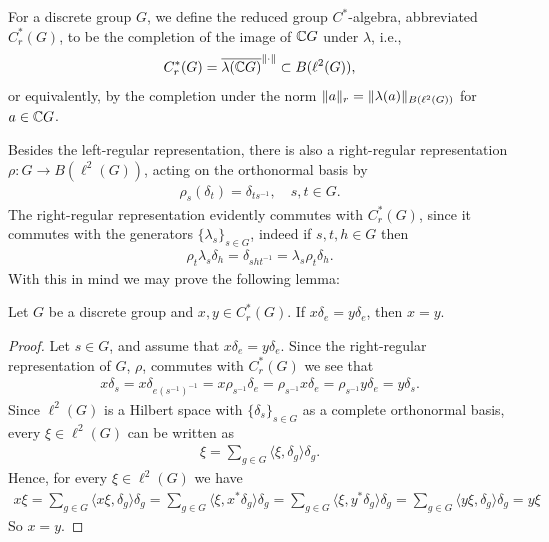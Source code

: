\begin{definition}\label{reduc alg def}
For a discrete group $G$, we define the reduced group $C^*$-algebra, abbreviated $C_r^*(G)$, to be the completion of the image of $\mathbb{C} G$ under $\lambda$, i.e.,
\begin{align*}
C_r^*(G)=\overline{\lambda(\mathbb{C} G)}^{\lVert \cdot \rVert} \subset B(\ell^2(G)),
\end{align*} 
or equivalently, by the completion under the norm $\lVert a \rVert_r=\lVert \lambda(a) \rVert_{B(\ell^2(G))}$ for $a \in \mathbb{C} G$.
\end{definition}

Besides the left-regular representation, there is also a right-regular representation $\rho \colon G \to B(\ell^2(G))$, acting on the orthonormal basis by
\begin{align*}
\rho_s ( \delta_t)=\delta_{t s^{-1}}, \quad s,t \in G.
\end{align*}
The right-regular representation evidently commutes with $C_r^*(G)$, since it commutes with the generators $\{\lambda_s\}_{s \in G}$, indeed if $s,t,h \in G$ then
\begin{align*}
\rho_{t} \lambda_{s} \delta_{h} = \delta_{sht^{-1}}= \lambda_s \rho_t \delta_h.
\end{align*}
With this in mind we may prove the following lemma:

\begin{lemma}\label{orth sep}
Let $G$ be a discrete group and $x,y \in C_r^*(G)$. If $x\delta_e = y \delta_e$, then $x=y$.
\begin{proof}
Let $s \in G$, and assume that $x \delta_e = y \delta_e$. Since the right-regular representation of $G$, $\rho$, commutes with $C_r^*(G)$ we see that
\begin{align*}
x \delta_s = x \delta_{e(s^{-1})^{-1}}=x \rho_{s^{-1}} \delta_e=\rho_{s^{-1}} x \delta_e=\rho_{s^{-1}} y \delta_e =y \delta_s.
\end{align*}
Since $\ell^2(G)$ is a Hilbert space with $\{\delta_s\}_{s \in G}$ as a complete orthonormal basis, every $\xi \in \ell^2(G)$ can be written as 
\begin{align*}
\xi = \sum_{g \in G} \langle \xi,\delta_g\rangle \delta_g.
\end{align*}
Hence, for every $\xi \in \ell^2(G)$ we have
\begin{align*}
x \xi = \sum_{g \in G} \langle x \xi , \delta_g \rangle \delta_g = \sum_{g \in G} \langle \xi , x^* \delta_g\rangle \delta_g= \sum_{g \in G} \langle \xi , y^* \delta_g \rangle \delta_g=\sum_{g \in G} \langle y\xi , \delta_g \rangle \delta_g = y \xi
\end{align*}
So $x=y$.
\end{proof}
\end{lemma}

